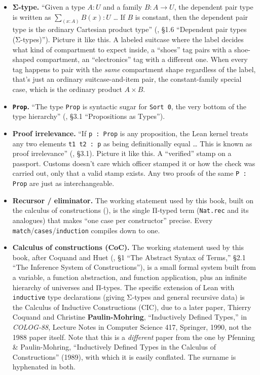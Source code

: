 \begin{itemize}
\tightlist
\item
  \textbf{Σ-type.} ``Given a type \(A : U\) and a family \(B : A \to U\), the dependent pair type is written as \(\sum_{(x:A)} B(x) : U\) \ldots{} If \(B\) is constant, then the dependent pair type is the ordinary Cartesian product type'' (\cite{HoTT2013}, §1.6 ``Dependent pair types (Σ-types)''). Picture it like this. A labeled suitcase where the label decides what kind of compartment to expect inside, a ``shoes'' tag pairs with a shoe-shaped compartment, an ``electronics'' tag with a different one. When every tag happens to pair with the \emph{same} compartment shape regardless of the label, that's just an ordinary suitcase-and-item pair, the constant-family special case, which is the ordinary product \(A \times B\).
\item
  \textbf{\texttt{Prop}.} ``The type \texttt{Prop} is syntactic sugar for \texttt{Sort 0}, the very bottom of the type hierarchy'' (\cite{TPIL4}, §3.1 ``Propositions as Types'').
\item
  \textbf{Proof irrelevance.} ``If \texttt{p : Prop} is any proposition, the Lean kernel treats any two elements \texttt{t1 t2 : p} as being definitionally equal \ldots{} This is known as proof irrelevance'' (\cite{TPIL4}, §3.1). Picture it like this. A ``verified'' stamp on a passport. Customs doesn't care which officer stamped it or how the check was carried out, only that a valid stamp exists. Any two proofs of the same \texttt{P : Prop} are just as interchangeable.
\item
  \textbf{Recursor / eliminator.} The working statement used by this book, built on the calculus of constructions (\cite{CoquandHuet1988}), is the single Π-typed term (\texttt{Nat.rec} and its analogues) that makes ``one case per constructor'' precise. Every \texttt{match}/\texttt{cases}/\texttt{induction} compiles down to one.
\item
  \textbf{Calculus of constructions (CoC).} The working statement used by this book, after Coquand and Huet (\cite{CoquandHuet1988}, §1 ``The Abstract Syntax of Terms,'' §2.1 ``The Inference System of Constructions''), is a small formal system built from a variable, a function abstraction, and function application, plus an infinite hierarchy of universes and Π-types. The specific extension of Lean with \texttt{inductive} type declarations (giving Σ-types and general recursive data) is the Calculus of Inductive Constructions (CIC), due to a later paper, Thierry Coquand and Christine \textbf{Paulin-Mohring}, ``Inductively Defined Types,'' in \emph{COLOG-88}, Lecture Notes in Computer Science 417, Springer, 1990, not the 1988 paper itself. Note that this is a \emph{different} paper from the one by Pfenning \& Paulin-Mohring, ``Inductively Defined Types in the Calculus of Constructions'' (1989), with which it is easily conflated. The surname is hyphenated in both.

\end{itemize}
